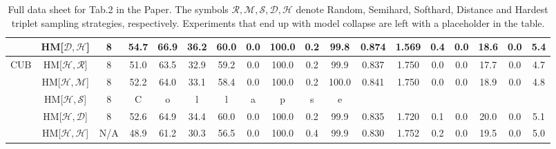 \begin{table*}
{\begin{tabular}{c|cc|cccc|ccccc|ccccc|c}
 & HM{[}$\mathcal{D},\mathcal{H}${]} & 8 & 54.7 & 66.9 & 36.2 & 60.0 & 0.0 & 100.0 & 0.2 & 99.8 & 0.874 & 1.569 & 0.4 & 0.0 & 18.6 & 0.0 & 5.4\tabularnewline
\hline 
\multirow{5}{*}{CUB} & HM{[}$\mathcal{H},\mathcal{R}${]} & 8 & 51.0 & 63.5 & 32.9 & 59.2 & 0.0 & 100.0 & 0.2 & 99.9 & 0.837 & 1.750 & 0.0 & 0.0 & 17.7 & 0.0 & 4.7\tabularnewline
 & HM{[}$\mathcal{H},\mathcal{M}${]} & 8 & 52.2 & 64.0 & 33.1 & 58.4 & 0.0 & 100.0 & 0.2 & 100.0 & 0.841 & 1.750 & 0.0 & 0.0 & 18.9 & 0.0 & 4.8\tabularnewline
 & HM{[}$\mathcal{H},\mathcal{S}${]} & 8 & C & o & l & l & a & p & s & e &  &  &  &  &  &  & \tabularnewline
 & HM{[}$\mathcal{H},\mathcal{D}${]} & 8 & 52.6 & 64.9 & 34.4 & 60.0 & 0.0 & 100.0 & 0.2 & 99.9 & 0.835 & 1.720 & 0.1 & 0.0 & 20.0 & 0.0 & 5.1\tabularnewline
 & HM{[}$\mathcal{H},\mathcal{H}${]} & N/A & 48.9 & 61.2 & 30.3 & 56.5 & 0.0 & 100.0 & 0.4 & 99.9 & 0.830 & 1.752 & 0.2 & 0.0 & 19.5 & 0.0 & 5.0\tabularnewline

	\bottomrule

\end{tabular}}

	\caption{Full data sheet for Tab.2 in the Paper. The symbols $\mathcal{R},
	\mathcal{M}, \mathcal{S}, \mathcal{D}, \mathcal{H}$ denote Random, Semihard,
	Softhard, Distance and Hardest triplet sampling strategies, respectively.
	Experiments that end up with model collapse are left with a placeholder 
	in the table.
	}
\label{tab:srcdest}
\end{table*}
